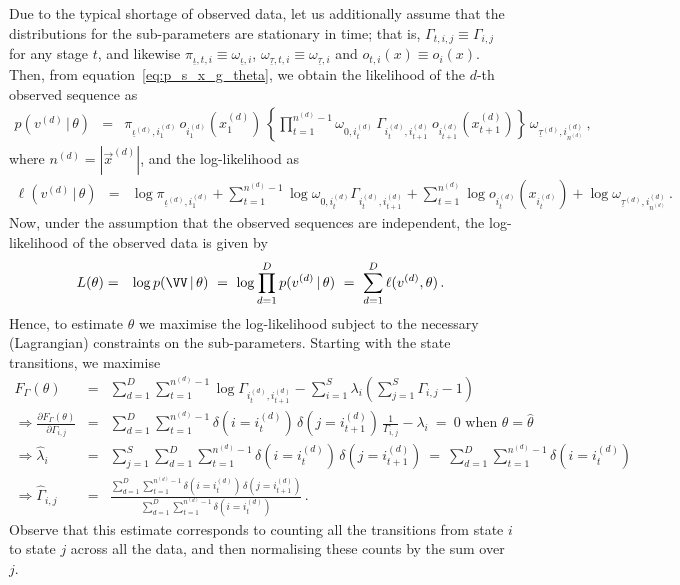 \documentclass[a4paper]{article}
\newcommand{\ui}{\underline{\iota}}
\newcommand{\ut}{\underline{\tau}}
\begin{document}
Due to the typical shortage of observed data, let us additionally assume that the distributions for the sub-parameters are stationary in time; 
that is, $\Gamma_{t,i,j}\equiv\Gamma_{i,j}$ for any stage $t$, 
and likewise $\pi_{\ui,t,i}\equiv\omega_{\ui,i}$,
$\omega_{\ut,t,i}\equiv\omega_{\ut,i}$ and $o_{t,i}(x)\equiv o_{i}(x)$.
Then, from equation~\eqref{eq:p_s_x_g_theta}, we obtain the likelihood of the $d$-th observed sequence as
\begin{eqnarray}
  \!\!\!p(v^{(d)}\,|\,\theta) & = & 
   \pi_{\ui^{(d)},i_1^{(d)}}\,o_{i_1^{(d)}}(x_1^{(d)})\,
\left\{\prod_{t=1}^{n^{(d)}-1}\omega_{0,i_t^{(d)}}\,\Gamma_{i_t^{(d)},i_{t+1}^{(d)}}\,o_{i_{t+1}^{(d)}}(x_{t+1}^{(d)})
\right\}\,\omega_{\ut^{(d)},i^{(d)}_{n^{(d)}}}\,,
\end{eqnarray}
where $n^{(d)}=|\vec{x}^{(d)}|$, and the log-likelihood as
\begin{eqnarray}
  \ell(v^{(d)}\,|\,\theta) & = &
   \log\pi_{\ui^{(d)},i_1^{(d)}}
 + \sum_{t=1}^{n^{(d)}-1}\log\omega_{0,i_t^{(d)}}\Gamma_{i_t^{(d)},i_{t+1}^{(d)}}
 + \sum_{t=1}^{n^{(d)}}\log o_{i_t^{(d)}}(x_{i_t^{(d)}})
 + \log\omega_{\ut^{(d)},i_{n^{(d)}}^{(d)}}\,.
\label{eq:log-prob-d}
\end{eqnarray}
Now, under the assumption that the observed sequences are independent, the log-likelihood of the observed data is given by
\begin{eqnarray}
  L(\theta) & = & \log p(\VV\,|\,\theta)
~=~\log\prod_{d=1}^D p(v^{(d)}\,|\,\theta) 
~=~ \sum_{d=1}^D \ell(v^{(d)},\theta)
\,.
\end{eqnarray}
Hence, to estimate $\theta$ we maximise the log-likelihood subject to the necessary (Lagrangian) constraints on the sub-parameters.
Starting with the state transitions, we maximise
\begin{eqnarray}
  F_{\Gamma}(\theta) & = & \sum_{d=1}^D \sum_{t=1}^{n^{(d)}-1}\log\Gamma_{i_t^{(d)},i_{t+1}^{(d)}}
-\sum_{i=1}^{S}\lambda_i\left(\sum_{j=1}^{S}\Gamma_{i,j}-1\right)
\label{eq:F_gamma}
\\
  \Rightarrow \frac{\partial F_{\Gamma}(\theta)}{\partial\Gamma_{i,j}} & = &
\sum_{d=1}^D \sum_{t=1}^{n^{(d)}-1}\delta(i=i_t^{(d)})\,\delta(j=i_{t+1}^{(d)})\,\frac{1}{\Gamma_{i,j}}-\lambda_{i}
~=~0 \mbox{ when }\theta=\hat{\theta}
\nonumber\\
  \Rightarrow\hat{\lambda}_i & = & \sum_{j=1}^{S}\sum_{d=1}^D \sum_{t=1}^{n^{(d)}-1}\delta(i=i_t^{(d)})\,\delta(j=i_{t+1}^{(d)})
~=~\sum_{d=1}^D \sum_{t=1}^{n^{(d)}-1}\delta(i=i_t^{(d)})
\nonumber\\
  \Rightarrow\hat{\Gamma}_{i,j} & = & 
  \frac{\sum_{d=1}^D \sum_{t=1}^{n^{(d)}-1}\delta(i=i_t^{(d)})\,\delta(j=i_{t+1}^{(d)})}
          {\sum_{d=1}^D \sum_{t=1}^{n^{(d)}-1}\delta(i=i_t^{(d)})}\,.
\end{eqnarray}
Observe that this estimate corresponds to counting all the transitions from state $i$ to state $j$ across all the data, and then normalising these counts by the sum over $j$.
\end{document}
